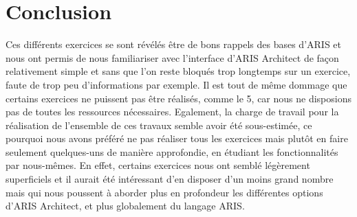 \section{Conclusion}

Ces différents exercices se sont révélés être de bons rappels des bases d'ARIS et nous ont permis de nous familiariser avec l'interface d'ARIS Architect de façon relativement simple et sans que l’on reste bloqués trop longtemps sur un exercice, faute de trop peu d'informations par exemple. Il est tout de même dommage que certains exercices ne puissent pas être réalisés, comme le 5, car nous ne disposions pas de toutes les ressources nécessaires. Egalement, la charge de travail pour la réalisation de l'ensemble de ces travaux semble avoir été sous-estimée, ce pourquoi nous avons préféré ne pas réaliser tous les exercices mais plutôt en faire seulement quelques-uns de manière approfondie, en étudiant les fonctionnalités par nous-mêmes. En effet, certains exercices nous ont semblé légèrement superficiels et il aurait été intéressant d'en disposer d'un moins grand nombre mais qui nous poussent à aborder plus en profondeur les différentes options d'ARIS Architect, et plus globalement du langage ARIS.

